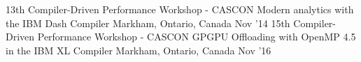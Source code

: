 \begin{cventries}
\cventry
  {13th Compiler-Driven Performance Workshop - CASCON}
  {Modern analytics with the IBM Dash Compiler}
  {Markham, Ontario, Canada}
  {Nov '14}
  {}
\cventry
  {15th Compiler-Driven Performance Workshop - CASCON}
  {GPGPU Offloading with OpenMP 4.5 in the IBM XL Compiler}
  {Markham, Ontario, Canada}
  {Nov '16}
  {}
\end{cventries}
